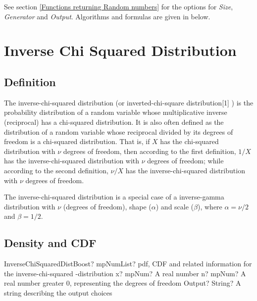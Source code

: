 \vspace{0.3cm}

See section \ref{Functions returning Random numbers} for the options for  {\itshape\sffamily Size},  {\itshape\sffamily Generator} and {\itshape\sffamily Output}. Algorithms and formulas are given in below.



\newpage
\section{Inverse Chi Squared Distribution}


\subsection{Definition}
\label{InverseChiSquaredDistributionDefinition}

The inverse-chi-squared distribution (or inverted-chi-square distribution[1] ) is the probability distribution of a random variable whose multiplicative inverse (reciprocal) has a chi-squared distribution. It is also often defined as the distribution of a random variable whose reciprocal divided by its degrees of freedom is a chi-squared distribution. That is, if $X$ has the chi-squared distribution with $\nu$  degrees of freedom, then according to the first definition, $1/X$ has the inverse-chi-squared distribution with  $\nu$  degrees of freedom; while according to the second definition, $\nu/X$ has the inverse-chi-squared distribution with  $\nu$  degrees of freedom. 

The inverse-chi-squared distribution is a special case of a inverse-gamma distribution with $\nu$ (degrees of freedom), shape ($\alpha$) and scale ($\beta$), where $\alpha=\nu/2$ and $\beta=1/2$.



\subsection{Density and CDF}

\begin{mpFunctionsExtract}
	\mpFunctionThreeNotImplemented
	{InverseChiSquaredDistBoost? mpNumList? pdf, CDF and related information for the inverse-chi-squared -distribution}
	{x? mpNum? A real number}
	{n? mpNum? A real number greater 0, representing the degrees of freedom}
	{Output? String? A string describing the output choices}
\end{mpFunctionsExtract}


